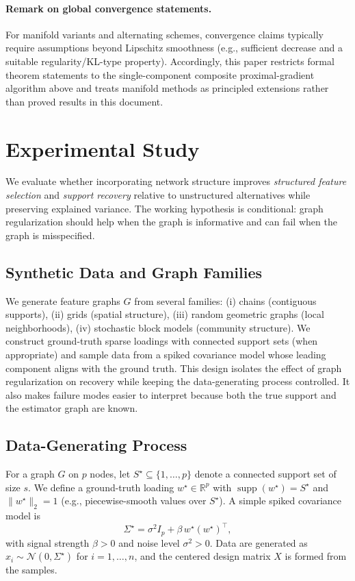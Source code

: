 \documentclass[10pt,twocolumn,letterpaper]{article}
\theoremstyle{definition}
\newcommand{\R}{\mathbb{R}}
\DeclareMathOperator{\supp}{supp}
\begin{document}
\paragraph{Remark on global convergence statements.}
For manifold variants and alternating schemes, convergence claims typically require assumptions beyond Lipschitz smoothness (e.g., sufficient decrease and a suitable regularity/KL-type property). Accordingly, this paper restricts formal theorem statements to the single-component composite proximal-gradient algorithm above and treats manifold methods as principled extensions rather than proved results in this document.

\section{Experimental Study}
We evaluate whether incorporating network structure improves \emph{structured feature selection} and \emph{support recovery} relative to unstructured alternatives while preserving explained variance. The working hypothesis is conditional: graph regularization should help when the graph is informative and can fail when the graph is misspecified.

\subsection{Synthetic Data and Graph Families}
We generate feature graphs $G$ from several families:
(i) chains (contiguous supports),
(ii) grids (spatial structure),
(iii) random geometric graphs (local neighborhoods),
(iv) stochastic block models (community structure).
We construct ground-truth sparse loadings with connected support sets (when appropriate) and sample data from a spiked covariance model whose leading component aligns with the ground truth. This design isolates the effect of graph regularization on recovery while keeping the data-generating process controlled. It also makes failure modes easier to interpret because both the true support and the estimator graph are known.

\subsection{Data-Generating Process}
For a graph $G$ on $p$ nodes, let $S^\star\subseteq\{1,\dots,p\}$ denote a connected support set of size $s$. We define a ground-truth loading $w^\star\in\R^p$ with $\supp(w^\star)=S^\star$ and $\|w^\star\|_2=1$ (e.g., piecewise-smooth values over $S^\star$). A simple spiked covariance model is
\begin{equation}
\Sigma^\star = \sigma^2 I_p + \beta\, w^\star (w^\star)^\top,
\end{equation}
with signal strength $\beta>0$ and noise level $\sigma^2>0$. Data are generated as $x_i\sim \mathcal{N}(0,\Sigma^\star)$ for $i=1,\dots,n$, and the centered design matrix $X$ is formed from the samples.
\end{document}
